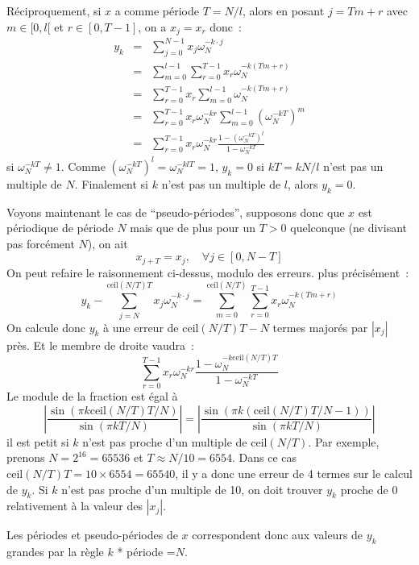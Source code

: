 \documentclass[a4paper,11pt]{article}
\begin{document}
\begin{giacjshere}
Réciproquement, si $x$ a comme période $T=N/l$, alors en posant
$j=T m + r$ avec $m\in[0,l[$ et $r\in[0,T-1]$, on a
$x_j=x_r$ donc~:
\begin{eqnarray*}
 y_k &=&\sum_{j=0}^{N-1} x_j \omega_N^{-k\cdot j} \\
&=&\sum_{m=0}^{l-1} \sum_{r=0}^{T-1} x_r \omega_N^{-k (T m+r)} \\
&=&\sum_{r=0}^{T-1} x_r \sum_{m=0}^{l-1} \omega_N^{-k (T m+r)} \\
&=& \sum_{r=0}^{T-1} x_r \omega_N^{-kr} \sum_{m=0}^{l-1}
(\omega_N^{-kT})^m \\
&=& \sum_{r=0}^{T-1} x_r \omega_N^{-kr} 
\frac{1-(\omega_N^{-kT})^l}{1-\omega_N^{-kT}}
\end{eqnarray*}
si $\omega_N^{-kT} \neq 1$. Comme $(\omega_N^{-kT})^l=\omega_N^{-klT}=1$,
$y_k=0$ si $kT=kN/l$ n'est pas un multiple de $N$. 
Finalement si $k$ n'est pas un multiple de $l$, alors $y_k=0$.

Voyons maintenant le cas de ``pseudo-périodes'', supposons donc
que $x$ est périodique de période $N$ mais que de plus pour un $T>0$ 
quelconque (ne divisant pas forcément $N$), on ait
\[ x_{j+T}=x_j, \quad \forall j \in[0,N-T] \]
On peut refaire le raisonnement ci-dessus, modulo des erreurs.
plus précisément~:
\[ y_k - \sum_{j=N}^{\mbox{ceil}(N/T)T}x_j \omega_N^{-k\cdot j} 
= \sum_{m=0}^{\mbox{ceil}(N/T)} \sum_{r=0}^{T-1} x_r \omega_N^{-k (T m+r)} \]
On calcule donc $y_k$ à une erreur de $\mbox{ceil}(N/T)T-N$ termes majorés
par $|x_j|$ près.
Et le membre de droite vaudra~:
\[ \sum_{r=0}^{T-1} x_r \omega_N^{-kr} 
\frac{1-\omega_N^{-k\mbox{ceil}(N/T) T}}{1-\omega_N^{-kT}}
\]
Le module de la fraction est égal à
\[ |\frac{\sin(\pi k \mbox{ceil}(N/T) T/N)}{\sin(\pi k T/N)} |
= |\frac{\sin(\pi k (\mbox{ceil}(N/T) T/N-1))}{\sin(\pi k T/N)} |
\]
il est petit si $k$ n'est pas proche d'un multiple de $\mbox{ceil}(N/T)$.
Par exemple, prenons $N=2^16=65536$ et $T \approx N/10 =6554$. Dans
ce cas $\mbox{ceil}(N/T)T=10 \times 6554=65540$, il y a donc une erreur
de 4 termes sur le calcul de $y_k$. Si $k$ n'est pas proche d'un multiple
de 10, on doit trouver $y_k$ proche de 0 relativement à la valeur des $|x_j|$.

Les périodes et pseudo-périodes de $x$ correspondent donc aux
valeurs de $y_k$ grandes par la règle $k$ * période =$N$.


\end{giacjshere}
\end{document}
